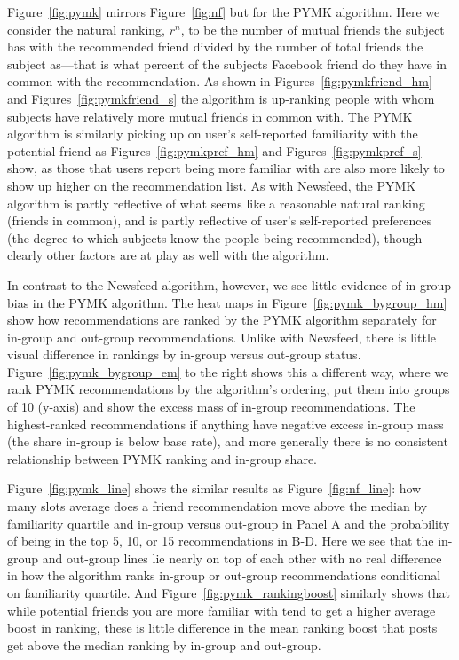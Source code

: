 \documentclass[12pt,letterpaper]{article}
\begin{document}
Figure~\ref{fig:pymk} mirrors Figure~\ref{fig:nf} but for the PYMK algorithm. Here we consider the natural ranking, $r^n$, to be the number of mutual friends the subject has with the recommended friend divided by the number of total friends the subject as---that is what percent of the subjects Facebook friend do they have in common with the recommendation. As shown in Figures~\ref{fig:pymkfriend_hm} and Figures~\ref{fig:pymkfriend_s} the algorithm is up-ranking people with whom subjects have relatively more mutual friends in common with. The PYMK algorithm is similarly picking up on user's self-reported familiarity with the potential friend as Figures~\ref{fig:pymkpref_hm} and Figures~\ref{fig:pymkpref_s} show, as those that users report being more familiar with are also more likely to show up higher on the recommendation list. As with Newsfeed, the PYMK algorithm is partly reflective of what seems like a reasonable natural ranking (friends in common), and is partly reflective of user's self-reported preferences (the degree to which subjects know the people being recommended), though clearly other factors are at play as well with the algorithm.

In contrast to the Newsfeed algorithm, however, we see little evidence of in-group bias in the PYMK algorithm. The heat maps in Figure~\ref{fig:pymk_bygroup_hm} show how recommendations are ranked by the PYMK algorithm separately for in-group and out-group recommendations. Unlike with Newsfeed, there is little visual difference in rankings by in-group versus out-group status. Figure~\ref{fig:pymk_bygroup_em} to the right shows this a different way, where we rank PYMK recommendations by the algorithm's ordering, put them into groups of 10 (y-axis) and show the excess mass of in-group recommendations. The highest-ranked recommendations if anything have negative excess in-group mass (the share in-group is below base rate), and more generally there is no consistent relationship between PYMK ranking and in-group share.

Figure~\ref{fig:pymk_line} shows the similar results as Figure~\ref{fig:nf_line}: how many slots average does a friend recommendation move above the median by familiarity quartile and in-group versus out-group in Panel A and the probability of being in the top 5, 10, or 15 recommendations in B-D. Here we see that the in-group and out-group lines lie nearly on top of each other with no real difference in how the algorithm ranks in-group or out-group recommendations conditional on familiarity quartile. And Figure~\ref{fig:pymk_rankingboost} similarly shows that while potential friends you are more familiar with tend to get a higher average boost in ranking, these is little difference in the mean ranking boost that posts get above the median ranking by in-group and out-group. 
\end{document}
